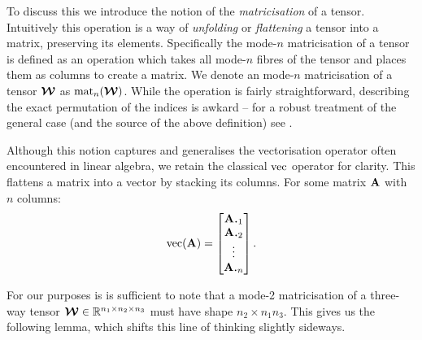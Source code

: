 To discuss
this we introduce the notion of the \emph{matricisation} of a tensor. Intuitively this
operation is a way of \emph{unfolding} or \emph{flattening} a tensor into a matrix,
preserving its elements. Specifically the mode-\(n\)
matricisation of a tensor is defined as an operation which takes all mode-\(n\) fibres
of the tensor and places them as columns to create a matrix. We denote an mode-\(n\)
matricisation of a tensor \(\bm{\mathcal{W}}\) as \(\operatorname{mat}_n(\bm{\mathcal{W}})\). While the operation is
fairly straightforward, describing the exact permutation of the indices is awkard -- 
for a robust treatment of the general case (and the source of the above definition) see
\autocite{Kolda2009}. 

Although this notion captures and generalises the vectorisation operator often
encountered in linear algebra, we retain the classical \(\operatorname{vec}\) operator for clarity.
This flattens a matrix into a vector by stacking its columns. For some matrix \(\mathbf{A}\) with
\(n\) columns:
\begin{equation}\label{eq:vec}
	\vect(\mat{A}) = \begin{bmatrix}
		\vec{A}_{\midbullet 1}\\
		\vec{A}_{\midbullet 2}\\
		\vdots\\
		\vec{A}_{\midbullet n}
	\end{bmatrix}.
\end{equation}

For our purposes is is sufficient to note that a 
mode-2 matricisation of a
three-way tensor \(\bm{\mathcal{W}} \in \mathbb{R}^{n_1\times n_2\times n_3}\) must have shape
\(n_2 \times n_1n_3\). This gives us the following lemma, which shifts this line of
thinking slightly sideways.

